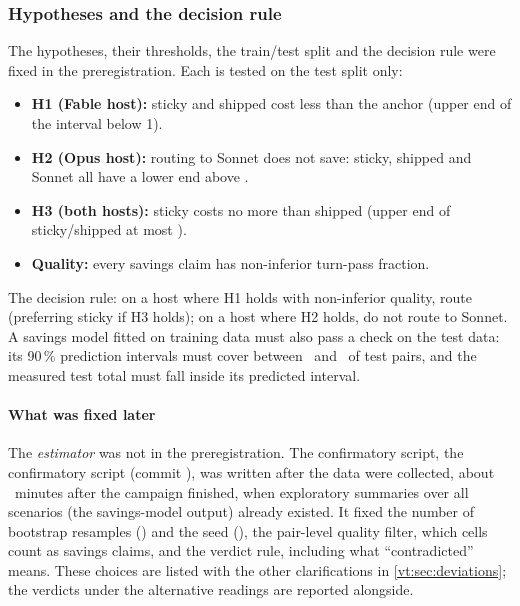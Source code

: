 \begin{table}[tbp]
\centering\scriptsize
\caption{Tools normalization by host and arm: first requests per model that found the tool prefix cold or warm, and
the dollars moved from the write rate to the read rate.}
\label{vt:tab:toolsnorm}

\end{table}

\begin{table}[tbp]
\centering\small
\caption{Confirmatory cost ratios (test split, pair reading) on the raw and the tools-normalized basis.}
\label{vt:tab:toolsratios}

\end{table}

\subsubsection{Hypotheses and the decision rule}

The hypotheses, their thresholds, the train/test split and the decision rule were fixed in the
preregistration. Each is tested on the test split only:
\begin{itemize}
  \item \textbf{H1 (Fable host):} sticky and shipped cost less than the anchor (upper end of the interval
    below 1).
  \item \textbf{H2 (Opus host):} routing to Sonnet does not save: sticky, shipped and Sonnet all have a
    lower end above \HTwoLower.
  \item \textbf{H3 (both hosts):} sticky costs no more than shipped (upper end of sticky/shipped at most
    \HThreeUpper).
  \item \textbf{Quality:} every savings claim has non-inferior turn-pass fraction.
\end{itemize}
The decision rule: on a host where H1 holds with non-inferior quality, route (preferring sticky if H3
holds); on a host where H2 holds, do not route to Sonnet. A savings model fitted on training data must
also pass a check on the test data: its 90\,\% prediction intervals must cover between \CovLow\ and
\CovHigh\ of test pairs, and the measured test total must fall inside its predicted interval.

\paragraph{What was fixed later} The \emph{estimator} was not in the preregistration. The confirmatory
script, the confirmatory script (commit \code{\ConfirmSha}), was written after the data were
collected, about \ConfirmAfterMin\ minutes after the campaign finished, when exploratory summaries over all
scenarios (the savings-model output) already existed. It fixed the number of bootstrap
resamples (\Boot) and the seed (\BootSeed), the pair-level quality filter, which cells count as savings
claims, and the verdict rule, including what ``contradicted'' means. These choices are listed with the other
clarifications in \cref{vt:sec:deviations}; the verdicts under the alternative readings are reported alongside.

